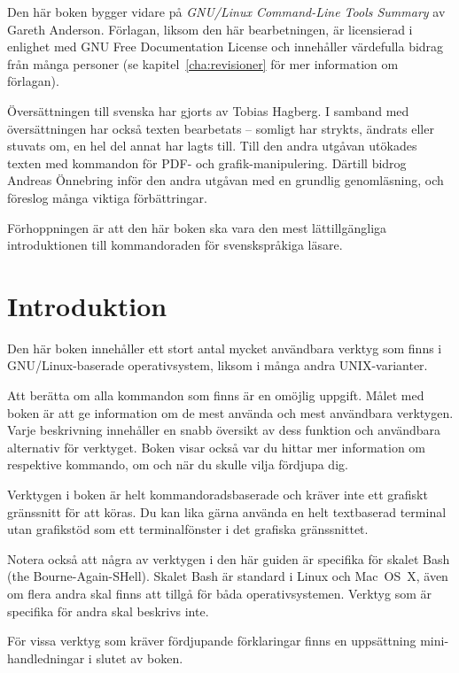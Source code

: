 \documentclass[10pt,a4paper,final]{book}
\newcommand{\charef}[1]{kapitel~\ref{#1}}
\newcommand{\xintro}[1]{{\Large #1\par}\vspace{.5\baselineskip}}
\begin{document}
Den här boken bygger vidare på \textit{GNU/Linux Command-Line Tools Summary} av Gareth Anderson. Förlagan, liksom den här bearbetningen, är licensierad i enlighet med GNU Free Documentation License och innehåller värdefulla bidrag från många personer (se \charef{cha:revisioner} för mer information om förlagan).

Översättningen till svenska har gjorts av Tobias Hagberg. I samband med översättningen har också texten bearbetats -- somligt har strykts, ändrats eller stuvats om, en hel del annat har lagts till. Till den andra utgåvan utökades texten med kommandon för PDF- och grafik-manipulering. Därtill bidrog Andreas Önnebring inför den andra utgåvan med en grundlig genomläsning, och föreslog många viktiga förbättringar.

Förhoppningen är att den här boken ska vara den mest lättillgängliga introduktionen till kommandoraden för svenskspråkiga läsare.

\chapter{Introduktion}

\xintro{Den här boken innehåller ett stort antal mycket användbara verktyg som finns i GNU/Linux-baserade operativsystem, liksom i många andra UNIX-varianter.}

Att berätta om alla kommandon som finns är en omöjlig uppgift. Målet med boken är att ge information om de mest använda och mest användbara verktygen. Varje beskrivning innehåller en snabb översikt av dess funktion och användbara alternativ för verktyget. Boken visar också var du hittar mer information om respektive kommando, om och när du skulle vilja fördjupa dig.

Verktygen i boken är helt kommandoradsbaserade och kräver inte ett grafiskt gränssnitt för att köras. Du kan lika gärna använda en helt textbaserad terminal utan grafikstöd som ett terminalfönster i det grafiska gränssnittet.

Notera också att några av verktygen i den här guiden är specifika för skalet Bash (the Bourne-Again-SHell). Skalet Bash är standard i Linux och Mac~OS~X, även om flera andra skal finns att tillgå för båda operativsystemen. Verktyg som är specifika för andra skal beskrivs inte.

För vissa verktyg som kräver fördjupande förklaringar finns en uppsättning mini-handledningar i slutet av boken.  
\end{document}
